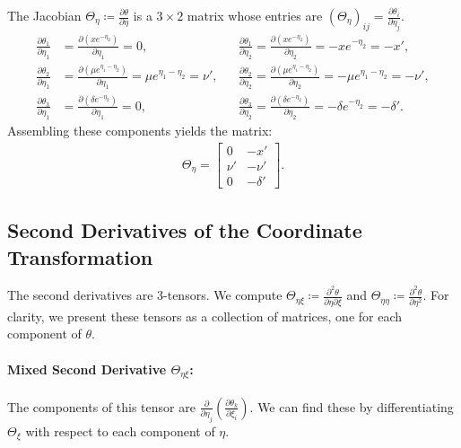 \documentclass{article}
\begin{document}
The Jacobian $\Theta_\eta \coloneqq \frac{\partial \theta}{\partial \eta}$ is a $3 \times 2$ matrix whose entries are $(\Theta_\eta)_{ij} = \frac{\partial \theta_i}{\partial \eta_j}$.
%
\begin{align}
  \frac{\partial \theta_1}{\partial \eta_1} & = \frac{\partial (x e^{-\eta_2})}{\partial \eta_1} = 0,                                        &  & \frac{\partial \theta_1}{\partial \eta_2} = \frac{\partial (x e^{-\eta_2})}{\partial \eta_2} = -x e^{-\eta_2} = -x',                       \\
  \frac{\partial \theta_2}{\partial \eta_1} & = \frac{\partial (\mu e^{\eta_1 - \eta_2})}{\partial \eta_1} = \mu e^{\eta_1 - \eta_2} = \nu', &  & \frac{\partial \theta_2}{\partial \eta_2} = \frac{\partial (\mu e^{\eta_1 - \eta_2})}{\partial \eta_2} = -\mu e^{\eta_1 - \eta_2} = -\nu', \\
  \frac{\partial \theta_3}{\partial \eta_1} & = \frac{\partial (\delta e^{-\eta_2})}{\partial \eta_1} = 0,                                   &  & \frac{\partial \theta_3}{\partial \eta_2} = \frac{\partial (\delta e^{-\eta_2})}{\partial \eta_2} = -\delta e^{-\eta_2} = -\delta'.
\end{align}
%
Assembling these components yields the matrix:
%
\begin{align}
  \Theta_{\eta} =
  \begin{bmatrix}
    0    & -x'      \\
    \nu' & -\nu'    \\
    0    & -\delta'
  \end{bmatrix}.
\end{align}

\subsection{Second Derivatives of the Coordinate Transformation}

The second derivatives are 3-tensors.
We compute $\Theta_{\eta\xi} \coloneqq \frac{\partial^2 \theta}{\partial \eta \partial \xi}$ and $\Theta_{\eta\eta} \coloneqq \frac{\partial^2 \theta}{\partial \eta^2}$.
For clarity, we present these tensors as a collection of matrices, one for each component of $\theta$.

\paragraph{Mixed Second Derivative $\Theta_{\eta\xi}$:}

The components of this tensor are $\frac{\partial}{\partial \eta_j} \left( \frac{\partial \theta_k}{\partial \xi_i} \right)$.
We can find these by differentiating $\Theta_\xi$ with respect to each component of $\eta$.
\end{document}
